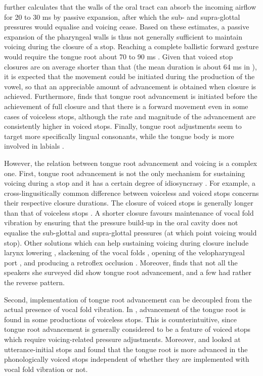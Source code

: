 \documentclass[
  12pt,
]{article}
\begin{document}
\citet{rothenberg1967} further calculates that the walls of the oral
tract can absorb the incoming airflow for 20 to 30 ms by passive
expansion, after which the sub- and supra-glottal pressures would
equalise and voicing cease. Based on these estimates, a passive
expansion of the pharyngeal walls is thus not generally sufficient to
maintain voicing during the closure of a stop. Reaching a complete
ballistic forward gesture would require the tongue root about 70 to 90
ms \citep{rothenberg1967}. Given that voiced stop closures are on
average shorter than that (the mean duration is about 64 ms in
\citealt{luce1985}), it is expected that the movement could be initiated
during the production of the vowel, so that an appreciable amount of
advancement is obtained when closure is achieved. Furthermore,
\citet{westbury1983} finds that tongue root advancement is initiated
before the achievement of full closure and that there is a forward
movement even in some cases of voiceless stops, although the rate and
magnitude of the advancement are consistently higher in voiced stops.
Finally, tongue root adjustments seem to target more specifically
lingual consonants, while the tongue body is more involved in labials
\citep{perkell1969, westbury1983}.

However, the relation between tongue root advancement and voicing is a
complex one. First, tongue root advancement is not the only mechanism
for sustaining voicing during a stop
\citep{rothenberg1967, westbury1983, ohala2011} and it has a certain
degree of idiosyncrasy \citep{ahn2018}. For example, a
cross-lingusitically common difference between voiceless and voiced
stops concerns their respective closure durations. The closure of voiced
stops is generally longer than that of voiceless stops
\citep{lisker1957, umeda1977, van-summers1987, davis1989, de-jong1991}.
A shorter closure favours maintenance of vocal fold vibration by
ensuring that the pressure build-up in the oral cavity does not equalise
the sub-glottal and supra-glottal pressures (at which point voicing
would stop). Other solutions which can help sustaining voicing during
closure include larynx lowering \citep{riordan1980}, slackening of the
vocal folds \citet{halle1967}, opening of the velopharyngeal port
\citep{yanagihara1966}, and producing a retroflex occlusion
\citep{sprouse2008}. Moreover, \citep{ahn2018} finds that not all the
speakers she surveyed did show tongue root advancement, and a few had
rather the reverse pattern.

Second, implementation of tongue root advancement can be decoupled from
the actual presence of vocal fold vibration. In \citet{westbury1983},
advancement of the tongue root is found in some productions of voiceless
stops. This is counterintuitive, since tongue root advancement is
generally considered to be a feature of voiced stops which require
voicing-related pressure adjustments. Moreover, \citet{ahn2015, ahn2018}
and \citet{ahn2016} looked at utterance-initial stops and found that the
tongue root is more advanced in the phonologically voiced stops
independent of whether they are implemented with vocal fold vibration or
not.
\end{document}
